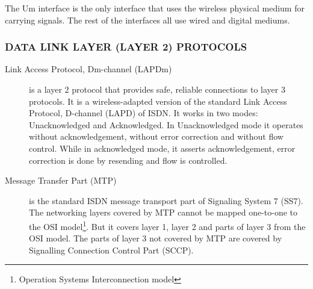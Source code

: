 The Um interface is the only interface that uses the wireless physical medium for carrying signals. The rest of the interfaces all use wired and digital mediums.

\subsubsection{\uppercase{Data Link Layer (Layer 2) protocols}}

\begin{description}
 \item [Link Access Protocol, Dm-channel (LAPDm)] is a layer 2 protocol that provides safe, reliable connections to layer 3 protocols. It is a wireless-adapted version of 
 the standard Link Access Protocol, D-channel (LAPD) of ISDN. It works in two modes: Unacknowledged and Acknowledged. In Unacknowledged mode it operates without acknowledgement,
 without error correction and without flow control. While in acknowledged mode, it asserts acknowledgement, error correction is done by resending and flow is controlled.
 \item [Message Transfer Part (MTP)] is the standard ISDN message transport part of Signaling System 7 (SS7). The networking layers covered by MTP cannot be mapped
 one-to-one to the OSI model\footnote{Operation Systems Interconnection model}. But it covers layer 1, layer 2 and parts of layer 3 from the OSI model. The parts of layer 3
 not covered by MTP are covered by Signalling Connection Control Part (SCCP).
\end{description}


